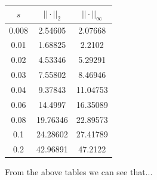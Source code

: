 \documentclass{article}
\begin{document}
\begin{multicols}{2}
\begin{center}
\begin{tabular}{ccc}
\hline  

$s$  &$||\cdot||_2$              &$||\cdot||_{\infty}$   \\
\hline  

0.008	    &2.54605   &2.07668 \\
0.01	    &1.68825   &2.2102 \\
0.02	    &4.53346   &5.29291 \\
0.03	    &7.55802   &8.46946 \\
0.04	    &9.37843   &11.04753 \\
0.06	    &14.4997   &16.35089 \\
0.08	    &19.76346   &22.89573 \\
0.1	    &24.28602   &27.41789 \\
0.2	    &42.96891   &47.2122 \\

\hline 
\end{tabular}
\end{center}

\end{multicols}

From the above tables we can see that...
\end{document}
